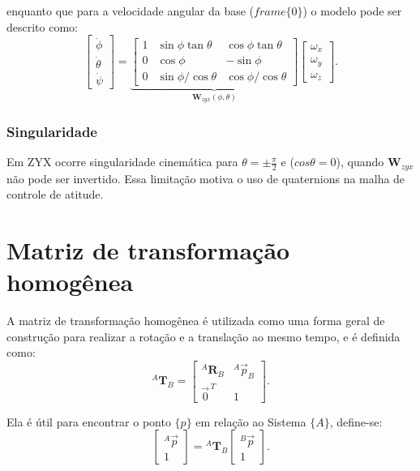 enquanto que para a velocidade angular da base ($frame \{0\}$) o modelo pode ser descrito como: 
\begin{equation}
\begin{bmatrix}\dot\phi\\ \dot\theta\\ \dot\psi\end{bmatrix}=
\underbrace{\begin{bmatrix}
1 & \sin\phi\tan\theta & \cos\phi\tan\theta\\
0 & \cos\phi & -\sin\phi\\
0 & \sin\phi/\cos\theta & \cos\phi/\cos\theta
\end{bmatrix}}_{\displaystyle \mathbf W_{zyx}(\phi,\theta)}
\begin{bmatrix}\omega_x\\ \omega_y\\ \omega_z\end{bmatrix}.
\end{equation}

\subsubsection{Singularidade}
Em ZYX ocorre singularidade cinemática para
$\theta=\pm\frac{\pi}{2}$ e ($cos\theta=0$),
quando $\mathbf W_{zyx}$ não pode ser invertido.
Essa limitação motiva o uso de quaternions na malha de controle de atitude.






\section{Matriz de transformação homogênea}
A matriz de transformação homogênea é utilizada como uma forma geral de construção para realizar a rotação e a translação ao mesmo tempo,
e é definida como:
\begin{equation}
\label{eq:def_T_AB}
{}^{A}\mathbf{T}_{B} =
\begin{bmatrix}
{}^{A}\mathbf{R}_{B} & {}^{A}\vec{p}_{B} \\
\vec{0}^{\,T} & 1
\end{bmatrix}.
\end{equation}

Ela é útil para encontrar o ponto $\{p\}$ em relação ao Sistema $\{A\}$, define-se:
\begin{equation}
\begin{bmatrix}
{}^A \vec{p} \\[2pt] 1
\end{bmatrix}
=
{}^A \mathbf{T}_B
\begin{bmatrix}
{}^B \vec{p} \\[2pt] 1
\end{bmatrix}.
\end{equation}

